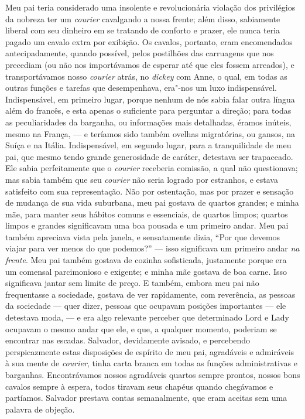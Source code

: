 Meu pai teria considerado uma insolente e revolucionária violação
dos privilégios da nobreza ter um \textit{courier} cavalgando a nossa
frente; além disso, sabiamente liberal com seu dinheiro em se tratando
de conforto e prazer, ele nunca teria pagado um cavalo extra por
exibição. Os cavalos, portanto, eram encomendados antecipadamente,
quando possível, pelos postilhões das carruagens que nos precediam (ou
não nos importávamos de esperar até que eles fossem arreados), e
transportávamos nosso \textit{courier} atrás, no \textit{dickey} com Anne, o
qual, em todas as outras funções e tarefas que desempenhava, era"-nos um
luxo indispensável. Indispensável, em primeiro lugar, porque nenhum de
nós sabia falar outra língua além do francês, e esta apenas o suficiente
para perguntar a direção; para todas as peculiaridades da barganha, ou
informações mais detalhadas, éramos inúteis, mesmo na França, --- e
teríamos sido também ovelhas migratórias, ou gansos, na Suíça e na
Itália. Indispensável, em segundo lugar, para a tranquilidade de meu
pai, que mesmo tendo grande generosidade de caráter, detestava ser
trapaceado. Ele sabia perfeitamente que o \textit{courier} receberia
comissão, a qual não questionava; mas sabia também que seu
\textit{courier} não seria logrado por estranhos, e estava satisfeito com
sua representação. Não por ostentação, mas por prazer e sensação de
mudança de sua vida suburbana, meu pai gostava de quartos grandes; e
minha mãe, para manter seus hábitos comuns e essenciais, de quartos
limpos; quartos limpos e grandes significavam uma boa pousada e um
primeiro andar. Meu pai também apreciava vista pela janela, e
sensatamente dizia, ``Por que devemos viajar para ver menos do que
podemos?'' --- isso significava um primeiro andar \textit{na frente}. Meu
pai também gostava de cozinha sofisticada, justamente porque era um
comensal parcimonioso e exigente; e minha mãe gostava de boa carne. Isso
significava jantar sem limite de preço. E também, embora meu pai não
frequentasse a sociedade, gostava de ver rapidamente, com reverência, as
pessoas da sociedade --- quer dizer, pessoas que ocupavam posições
importantes --- ele detestava moda, --- e era algo relevante perceber que
determinado Lord e Lady ocupavam o mesmo andar que ele, e que, a
qualquer momento, poderiam se encontrar nas escadas. Salvador,
devidamente avisado, e percebendo perspicazmente estas disposições de
espírito de meu pai, agradáveis e admiráveis à sua mente de
\textit{courier}, tinha carta branca em todas as funções administrativas e
barganhas. Encontrávamos nossos agradáveis quartos sempre prontos,
nossos bons cavalos sempre à espera, todos tiravam seus chapéus quando
chegávamos e partíamos. Salvador prestava contas semanalmente, que eram
aceitas sem uma palavra de objeção.

